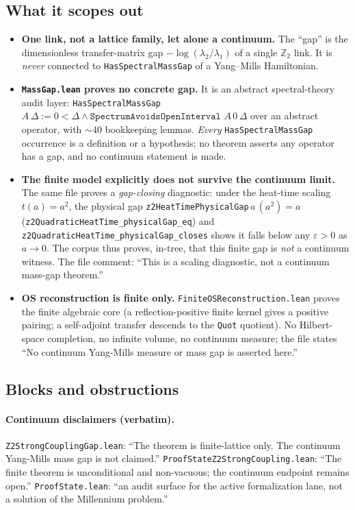 \subsection{What it scopes out}
\label{sec:ym-scopes}

\begin{itemize}
  \item \textbf{One link, not a lattice family, let alone a continuum.} The
  ``gap'' is the dimensionless transfer-matrix gap $-\log(\lambda_2/\lambda_1)$
  of a single $\mathbb{Z}_2$ link. It is \emph{never} connected to
  \texttt{HasSpectralMassGap} of a Yang--Mills Hamiltonian.
  \item \textbf{\texttt{MassGap.lean} proves no concrete gap.} It is an abstract
  spectral-theory audit layer: \texttt{HasSpectralMassGap }$A\,\Delta := 0<\Delta
  \wedge \texttt{SpectrumAvoidsOpenInterval }A\,0\,\Delta$ over an abstract
  operator, with $\sim 40$ bookkeeping lemmas. \emph{Every}
  \texttt{HasSpectralMassGap} occurrence is a definition or a hypothesis; no
  theorem asserts any operator has a gap, and no continuum statement is made.
  \item \textbf{The finite model explicitly does not survive the continuum
  limit.} The same file proves a \emph{gap-closing} diagnostic: under the
  heat-time scaling $t(a)=a^2$, the physical gap
  \texttt{z2HeatTimePhysicalGap}$\,a\,(a^2)=a$
  (\texttt{z2QuadraticHeatTime\_physicalGap\_eq}) and
  \texttt{z2QuadraticHeatTime\_physicalGap\_closes} shows it falls below any
  $\varepsilon>0$ as $a\to 0$. The corpus thus proves, in-tree, that this finite
  gap is \emph{not} a continuum witness. The file comment: ``This is a scaling
  diagnostic, not a continuum mass-gap theorem.''
  \item \textbf{OS reconstruction is finite only.}
  \texttt{FiniteOSReconstruction.lean} proves the finite algebraic core (a
  reflection-positive finite kernel gives a positive pairing; a self-adjoint
  transfer descends to the \texttt{Quot} quotient). No Hilbert-space completion,
  no infinite volume, no continuum measure; the file states ``No continuum
  Yang-Mills measure or mass gap is asserted here.''
\end{itemize}

\subsection{Blocks and obstructions}
\label{sec:ym-blocks}

\paragraph{Continuum disclaimers (verbatim).}
\texttt{Z2StrongCouplingGap.lean}: ``The theorem is finite-lattice only. The
continuum Yang-Mills mass gap is not claimed.''
\texttt{ProofStateZ2StrongCoupling.lean}: ``The finite theorem is unconditional
and non-vacuous; the continuum endpoint remains open.''
\texttt{ProofState.lean}: ``an audit surface for the active formalization lane,
not a solution of the Millennium problem.''


